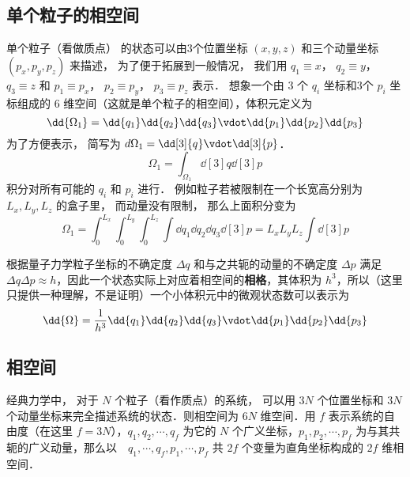 
\begin{issues}
\issueDraft
\end{issues}

\subsection{单个粒子的相空间}

单个粒子（看做质点） 的状态可以由3个位置坐标 $(x,y,z)$ 和三个动量坐标 $(p_x, p_y, p_z)$ 来描述， 为了便于拓展到一般情况， 我们用 $q_1 \equiv x$，   $q_2 \equiv y$， $q_3 \equiv z$   和 $p_1 \equiv p_x$， $p_2 \equiv p_y$， $p_3 \equiv p_z$ 表示． 想象一个由 3 个 $q_i$  坐标和3个 $p_i$  坐标组成的 $6$ 维空间（这就是单个粒子的相空间），体积元定义为
\begin{equation}
\dd{\Omega_1} = \dd{q_1}\dd{q_2}\dd{q_3} \vdot \dd{p_1}\dd{p_2}\dd{p_3}
\end{equation} 
为了方便表示， 简写为  $d{\Omega_1} = \dd[3]{q} \vdot \dd[3]{p}$． 
\begin{equation}
\Omega_1 = \int_{\Omega_1} \dd[3]{q} \dd[3]{p}
\end{equation} 
积分对所有可能的 $q_i$ 和 $p_i$ 进行． 例如粒子若被限制在一个长宽高分别为 $L_x, L_y, L_z$ 的盒子里， 而动量没有限制， 那么上面积分变为
\begin{equation}
\Omega_1 = \int_0^{L_x} \int_0^{L_y} \int_0^{L_z} \int \dd{q_1} \dd{q_2} \dd{q_3} \dd[3]{p} = L_x L_y L_z\int \dd[3]{p} 
\end{equation} 

根据量子力学粒子坐标的不确定度 $\Delta q$ 和与之共轭的动量的不确定度 $\Delta p$ 满足 $\Delta q\Delta p\approx h$，因此一个状态实际上对应着相空间的\textbf{相格}，其体积为 $h^3$，所以（这里只提供一种理解，不是证明）一个小体积元中的微观状态数可以表示为
\begin{equation}
\dd{\Omega}=\frac{1}{h^3}\dd{q_1}\dd{q_2}\dd{q_3} \vdot \dd{p_1}\dd{p_2}\dd{p_3}
\end{equation}

\subsection{相空间}
经典力学中， 对于 $N$ 个粒子（看作质点）的系统， 可以用 $3N$ 个位置坐标和 $3N$ 个动量坐标来完全描述系统的状态．则相空间为 $6N$ 维空间．用 $f$ 表示系统的自由度（在这里 $f=3N$），$q_1,q_2,\cdots,q_f$ 为它的 $N$ 个广义坐标，$p_1,p_2,\cdots,p_f$ 为与其共轭的广义动量，那么以　$q_1,\cdots,q_f,p_1,\cdots,p_f$ 共 $2f$ 个变量为直角坐标构成的 $2f$ 维相空间．

